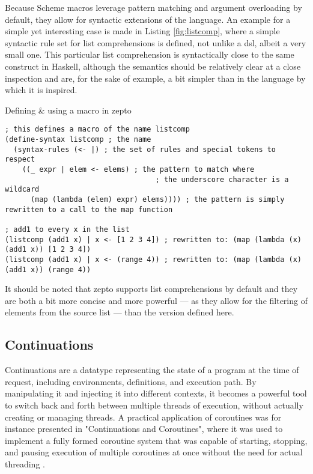 \documentclass[oneside,11pt,xetex]{scrbook}
\begin{document}
Because Scheme macros leverage pattern matching and argument overloading by default,
they allow for syntactic extensions of the language. An example for a simple yet
interesting case is made in Listing \ref{fig:listcomp}, where a simple syntactic rule set
for list comprehensions is defined, not unlike a \gls{dsl}, albeit a very small one.
This particular list comprehension is syntactically close to the same construct in
Haskell, although the semantics should be relatively clear at a close inspection and
are, for the sake of example, a bit simpler than in the language by which it is inspired.

\begin{listing}[H]
\caption{Defining \& using a macro in zepto}
\begin{verbatim}
; this defines a macro of the name listcomp
(define-syntax listcomp ; the name
  (syntax-rules (<- |) ; the set of rules and special tokens to respect
    ((_ expr | elem <- elems) ; the pattern to match where
                                   ; the underscore character is a wildcard
      (map (lambda (elem) expr) elems)))) ; the pattern is simply rewritten to a call to the map function

; add1 to every x in the list
(listcomp (add1 x) | x <- [1 2 3 4]) ; rewritten to: (map (lambda (x) (add1 x)) [1 2 3 4])
(listcomp (add1 x) | x <- (range 4)) ; rewritten to: (map (lambda (x) (add1 x)) (range 4))
\end{verbatim}
\label{fig:listcomp}
\end{listing}

It should be noted that zepto supports list comprehensions by default and they are
both a bit more concise and more powerful --- as they allow for the filtering of
elements from the source list --- than the version defined here.

\subsection{Continuations}
\label{continuation}

Continuations are a datatype representing the state of a program at the time of
request, including environments, definitions, and execution path. By manipulating
it and injecting it into different contexts, it becomes a powerful tool to switch
back and forth between multiple threads of execution, without actually creating
or managing threads. A practical application of coroutines was for instance
presented in "Continuations and Coroutines", where it was used to implement a fully formed
coroutine system that was capable of starting, stopping, and pausing execution
of multiple coroutines at once without the need for actual threading \parencite{COR}.
\end{document}
